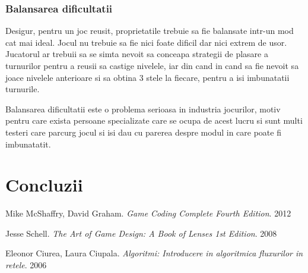 \documentclass[12pt, a4paper]{article}
\begin{document}
	
	
	\subsubsection{Balansarea dificultatii}
	
	Desigur, pentru un joc reusit, proprietatile trebuie sa fie balansate intr-un mod cat mai ideal. Jocul nu trebuie sa fie nici foate dificil dar nici extrem de usor. Jucatorul ar trebuii sa se simta nevoit sa conceapa strategii de plasare a turnurilor pentru a reusii sa castige nivelele, iar din cand in cand sa fie nevoit sa joace nivelele anterioare si sa obtina 3 stele la fiecare, pentru a isi imbunatatii turnurile.
	\newline
	
	Balansarea dificultatii este o problema serioasa in industria jocurilor, motiv pentru care exista persoane specializate care se ocupa de acest lucru si sunt multi testeri care parcurg jocul si isi dau cu parerea despre modul in care poate fi imbunatatit.
	
	
	
	
	
	\section{Concluzii}
	
	
	
	
	
	\pagebreak
	\begin{thebibliography}{3}
		Mike McShaffry, David Graham. \newline
		\textit{Game Coding Complete Fourth Edition}. 2012
		
		Jesse Schell.  \newline
		\textit{The Art of Game Design: A Book of Lenses 1st Edition}. 2008
		
		Eleonor Ciurea, Laura Ciupala.  \newline
		\textit{Algoritmi: Introducere in algoritmica fluxurilor in retele}. 2006
		
		
	\end{thebibliography}
	
	
\end{document}

